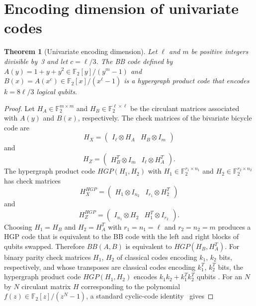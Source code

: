 \documentclass[aps,prxquantum,twocolumn,superscriptaddress,nofootinbib]{revtex4-2}
\newtheorem{theorem}{Theorem}
\newcommand{\FF}{\ensuremath{\mathbb{F}}}
\begin{document}
\section{Encoding dimension of univariate codes}
\label{app:crt}

\begin{theorem}[Univariate encoding dimension]
\label{lem:crt_k}
Let $\ell$ and $m$ be positive integers divisible by~3 and let $c = \ell/3$. The BB code defined by $A(y) = 1{+}y{+}y^2 \in \FF_2[y]/(y^m{-}1)$ and $B(x) = A(x^c) \in \FF_2[x]/(x^\ell{-}1)$ is a hypergraph product code that encodes $k = 8\ell/3$ logical qubits.
\end{theorem}

\begin{proof}
Let $H_A\in {\mathbb F}_2^{m\times m}$ and $H_B\in {\mathbb F}_2^{\ell\times\ell}$ be the circulant matrices associated with $A(y)$ and $B(x)$, respectively. The check matrices of the bivariate bicycle code are
\begin{equation}
H_X = \left(\begin{array}{c|c}
I_\ell\otimes H_A & H_B\otimes I_m
\end{array}\right)
\end{equation}
and
\begin{equation}
H_Z = \left(\begin{array}{c|c}
H_B^T\otimes I_m & I_\ell\otimes H_A^T
\end{array}\right).
\end{equation}
The hypergraph product code $HGP(H_1,H_2)$ with $H_1\in {\mathbb F}_2^{r_1\times n_1}$ and $H_2\in {\mathbb F}_2^{r_2\times n_2}$ has check matrices
\begin{equation}
H_X^{HGP} = \left(\begin{array}{c|c}
H_1\otimes I_{n_2} & I_{r_1}\otimes H_2^T
\end{array}\right)
\end{equation}
and
\begin{equation}
H_Z^{HGP} = \left(\begin{array}{c|c}
I_{n_1}\otimes H_2 & H_1^T\otimes I_{r_2}
\end{array}\right).
\end{equation}
Choosing $H_1=H_B$ and $H_2=H_A^T$ with $r_1=n_1=\ell$ and $r_2=n_2=m$ produces a HGP code that is equivalent to the BB code with the left and right blocks of qubits swapped. Therefore $BB(A,B)$ is equivalent to $HGP(H_B,H_A^T)$. For binary parity check matrices $H_1$, $H_2$ of classical codes encoding $k_1$, $k_2$ bits, respectively, and whose transposes are classical codes encoding $k_1^T$, $k_2^T$ bits, the hypergraph product code $HGP(H_1,H_2)$ encodes $k_1k_2+k_1^Tk_2^T$ qubits \cite{tillich2014quantum}. For an $N$ by $N$ circulant matrix $H$ corresponding to the polynomial $f(z)\in {\mathbb F}_2[z]/(z^N-1)$, a standard cyclic-code identity~\cite{macwilliams1977theory} gives

\end{proof}
\end{document}
